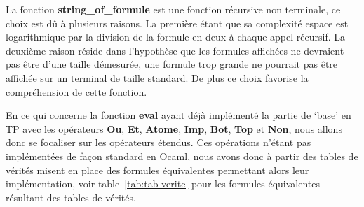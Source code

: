 \documentclass[12pt]{article}
\begin{document}
    \vphantom{}

    La fonction \textbf{string\_of\_formule} est une fonction récursive non 
    terminale, ce choix est dû à plusieurs raisons. La première étant que sa 
    complexité espace est logarithmique par la division de la formule en 
    deux à chaque appel récursif. La deuxième raison réside dans l'hypothèse que
    les formules affichées ne devraient pas être d'une taille démesurée, une 
    formule trop grande ne pourrait pas être affichée sur un terminal de taille
    standard. De plus ce choix favorise la compréhension de cette fonction.

    \vphantom{}

    En ce qui concerne la fonction \textbf{eval} ayant déjà implémenté la
    partie de `base' en TP avec les opérateurs \textbf{Ou}, \textbf{Et}, 
    \textbf{Atome}, \textbf{Imp}, \textbf{Bot}, \textbf{Top} et \textbf{Non},
    nous allons donc se focaliser sur les opérateurs étendus. Ces opérations 
    n'étant pas implémentées de façon standard en Ocaml, nous avons donc à 
    partir des tables de vérités misent en place des formules équivalentes 
    permettant alors leur implémentation, voir table~\ref{tab:tab-verite} pour 
    les formules équivalentes résultant des tables de vérités.  
\end{document}
